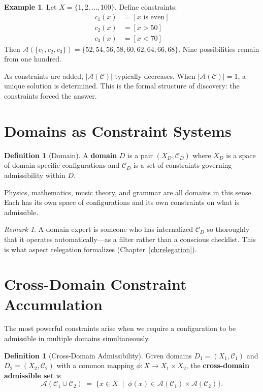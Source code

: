 \documentclass[11pt]{book}
\theoremstyle{plain}
\theoremstyle{definition}
\newtheorem{definition}[theorem]{Definition}
\newtheorem{example}[theorem]{Example}
\theoremstyle{remark}
\newtheorem{remark}[theorem]{Remark}
\newcommand{\C}{\mathcal{C}}
\newcommand{\A}{\mathcal{A}}
\begin{document}
\begin{example}
Let $X = \{1, 2, \ldots, 100\}$. Define constraints:
\begin{align*}
  c_1(x) &= [x \text{ is even}] \\
  c_2(x) &= [x > 50] \\
  c_3(x) &= [x < 70]
\end{align*}
Then $\A(\{c_1, c_2, c_3\}) = \{52, 54, 56, 58, 60, 62, 64, 66, 68\}$.
Nine possibilities remain from one hundred.
\end{example}

As constraints are added, $|\A(\C)|$ typically decreases. When
$|\A(\C)| = 1$, a unique solution is determined. This is the formal
structure of discovery: the constraints forced the answer.

\section{Domains as Constraint Systems}

\begin{definition}[Domain]
A \textbf{domain} $D$ is a pair $(X_D, \C_D)$ where $X_D$ is a space of
domain-specific configurations and $\C_D$ is a set of constraints
governing admissibility within $D$.
\end{definition}

Physics, mathematics, music theory, and grammar are all domains in this
sense. Each has its own space of configurations and its own constraints on
what is admissible.

\begin{remark}
A domain expert is someone who has internalized $\C_D$ so thoroughly that
it operates automatically---as a filter rather than a conscious checklist.
This is what aspect relegation formalizes (Chapter~\ref{ch:relegation}).
\end{remark}

\section{Cross-Domain Constraint Accumulation}

The most powerful constraints arise when we require a configuration to be
admissible in multiple domains simultaneously.

\begin{definition}[Cross-Domain Admissibility]
Given domains $D_1 = (X_1, \C_1)$ and $D_2 = (X_2, \C_2)$ with a common
mapping $\phi : X \to X_1 \times X_2$, the \textbf{cross-domain admissible
set} is
\[
  \A(\C_1 \cup \C_2) \;=\; \bigl\{ x \in X \;\mid\;
  \phi(x) \in \A(\C_1) \times \A(\C_2) \bigr\}.
\]
\end{definition}
\end{document}
